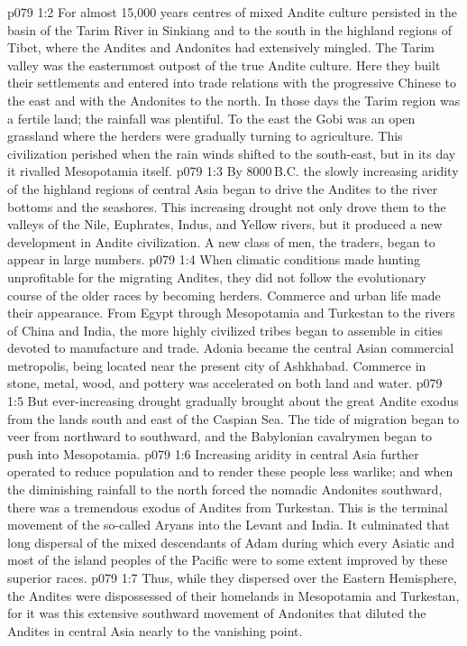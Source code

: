 \vs p079 1:2 \pc For almost 15,000 years centres of mixed Andite culture persisted in the basin of the Tarim River in Sinkiang and to the south in the highland regions of Tibet, where the Andites and Andonites had extensively mingled. The Tarim valley was the easternmost outpost of the true Andite culture. Here they built their settlements and entered into trade relations with the progressive Chinese to the east and with the Andonites to the north. In those days the Tarim region was a fertile land; the rainfall was plentiful. To the east the Gobi was an open grassland where the herders were gradually turning to agriculture. This civilization perished when the rain winds shifted to the south\hyp{}east, but in its day it rivalled Mesopotamia itself.
\vs p079 1:3 \pc By 8000\,B.C. the slowly increasing aridity of the highland regions of central Asia began to drive the Andites to the river bottoms and the seashores. This increasing drought not only drove them to the valleys of the Nile, Euphrates, Indus, and Yellow rivers, but it produced a new development in Andite civilization. A new class of men, the traders, began to appear in large numbers.
\vs p079 1:4 When climatic conditions made hunting unprofitable for the migrating Andites, they did not follow the evolutionary course of the older races by becoming herders. Commerce and urban life made their appearance. From Egypt through Mesopotamia and Turkestan to the rivers of China and India, the more highly civilized tribes began to assemble in cities devoted to manufacture and trade. Adonia became the central Asian commercial metropolis, being located near the present city of Ashkhabad. Commerce in stone, metal, wood, and pottery was accelerated on both land and water.
\vs p079 1:5 But ever\hyp{}increasing drought gradually brought about the great Andite exodus from the lands south and east of the Caspian Sea. The tide of migration began to veer from northward to southward, and the Babylonian cavalrymen began to push into Mesopotamia.
\vs p079 1:6 Increasing aridity in central Asia further operated to reduce population and to render these people less warlike; and when the diminishing rainfall to the north forced the nomadic Andonites southward, there was a tremendous exodus of Andites from Turkestan. This is the terminal movement of the so\hyp{}called Aryans into the Levant and India. It culminated that long dispersal of the mixed descendants of Adam during which every Asiatic and most of the island peoples of the Pacific were to some extent improved by these superior races.
\vs p079 1:7 Thus, while they dispersed over the Eastern Hemisphere, the Andites were dispossessed of their homelands in Mesopotamia and Turkestan, for it was this extensive southward movement of Andonites that diluted the Andites in central Asia nearly to the vanishing point.
